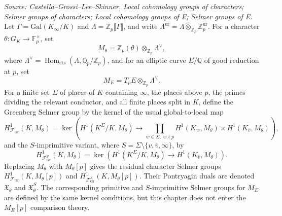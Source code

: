 \begin{definition}
  \label{def:iwasawa-algebra}
  \textit{Source: Castella--Grossi--Lee--Skinner, Local cohomology groups of characters; Selmer groups of characters; Local cohomology groups of E; Selmer groups of E.}
  Let \(\Gamma = \mathrm{Gal}(K_\infty/K)\) and \(\Lambda = \mathbb{Z}_p\llbracket \Gamma\rrbracket\), and write \(\Lambda^{\mathrm{ur}} = \Lambda \widehat{\otimes}_{\mathbb{Z}_p}\mathbb{Z}_p^{\mathrm{ur}}\).
  For a character \(\theta : G_K \to \mathbb{F}_p^\times\), set
  \[
    M_\theta = \mathbb{Z}_p(\theta)\otimes_{\mathbb{Z}_p}\Lambda^\vee,
  \]
  where \(\Lambda^\vee = \operatorname{Hom}_{\mathrm{cts}}(\Lambda,\mathbb{Q}_p/\mathbb{Z}_p)\), and for an elliptic curve \(E/\mathbb{Q}\) of good reduction at \(p\), set
  \[
    M_E = T_pE\otimes_{\mathbb{Z}_p}\Lambda^\vee.
  \]
  For a finite set \(\Sigma\) of places of \(K\) containing \(\infty\), the places above \(p\), the primes dividing the relevant conductor, and all finite places split in \(K\), define the Greenberg Selmer group by the kernel of the usual global-to-local map
  \[
    H^1_{\mathcal{F}_{\mathrm{Gr}}}(K,M_\theta)
    = \ker\!\left(H^1(K^\Sigma/K,M_\theta)\to \prod_{w\in\Sigma,\;w\nmid p} H^1(K_w,M_\theta)\times H^1(K_{\bar v},M_\theta)\right),
  \]
  and the \(S\)-imprimitive variant, where \(S=\Sigma\setminus\{v,\bar v,\infty\}\), by
  \[
    H^1_{\mathcal{F}_{\mathrm{Gr}}^S}(K,M_\theta)
    = \ker\!\left(H^1(K^\Sigma/K,M_\theta)\to H^1(K_{\bar v},M_\theta)\right).
  \]
  Replacing \(M_\theta\) with \(M_\theta[p]\) gives the residual character Selmer groups \(H^1_{\mathcal{F}_{\mathrm{Gr}}}(K,M_\theta[p])\) and \(H^1_{\mathcal{F}_{\mathrm{Gr}}^S}(K,M_\theta[p])\). Their Pontryagin duals are denoted \(\mathfrak{X}_\theta\) and \(\mathfrak{X}_\theta^S\). The corresponding primitive and \(S\)-imprimitive Selmer groups for \(M_E\) are defined by the same kernel conditions, but this chapter does not enter the \(M_E[p]\) comparison theory.
\end{definition}

